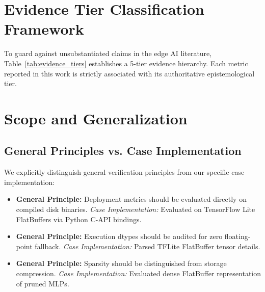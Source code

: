\documentclass[journal]{IEEEtran}
\begin{document}
\section{Evidence Tier Classification Framework}

\begin{table}[t]
\centering
\caption{The 5-Tier Evidence Classification Framework}
\label{tab:evidence_tiers}
\end{table}

To guard against unsubstantiated claims in the edge AI literature, Table~\ref{tab:evidence_tiers} establishes a 5-tier evidence hierarchy. Each metric reported in this work is strictly associated with its authoritative epistemological tier.

\section{Scope and Generalization}
\subsection{General Principles vs. Case Implementation}
We explicitly distinguish general verification principles from our specific case implementation:
\begin{itemize}
    \item \textbf{General Principle:} Deployment metrics should be evaluated directly on compiled disk binaries. \textit{Case Implementation:} Evaluated on TensorFlow Lite FlatBuffers via Python C-API bindings.
    \item \textbf{General Principle:} Execution dtypes should be audited for zero floating-point fallback. \textit{Case Implementation:} Parsed TFLite FlatBuffer tensor details.
    \item \textbf{General Principle:} Sparsity should be distinguished from storage compression. \textit{Case Implementation:} Evaluated dense FlatBuffer representation of pruned MLPs.
\end{itemize}
\end{document}
